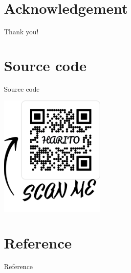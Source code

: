\documentclass[10pt]{beamer}
\begin{document}
\section*{Acknowledgement}  
\begin{frame}
\textcolor{myNewColorC}{\Huge{\centerline{Thank you!}}}
\end{frame}

\section*{Source code}  
\begin{frame}{Source code}
\begin{center}
    \includegraphics[height=6cm]{QR_link.png}
\end{center}
\end{frame}

\section*{Reference}  
\begin{frame}{Reference}
\scriptsize


\end{frame}
\end{document}
